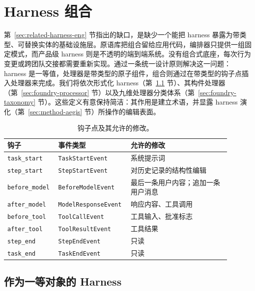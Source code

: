 \section{Harness 组合}
\label{sec:method-foundry}

第~\ref{sec:related-harness-eng} 节指出的缺口，是缺少一个能把 harness 暴露为带类型、可替换实体的基础设施层。原语库把组合留给应用代码，编排器只提供一组固定模式，而产品级 harness 则是不透明的端到端系统。没有组合式底座，每次行为变更或跨团队交接都需要重新实现。\ProjectName 通过一条统一设计原则解决这一问题：harness 是一等值，处理器是带类型的原子组件，组合则通过在带类型的钩子点插入处理器来完成。我们将依次形式化 harness（第~\ref{sec:foundry-object} 节）、其构件处理器（第~\ref{sec:foundry-processor} 节）以及九维处理器分类体系（第~\ref{sec:foundry-taxonomy} 节）。这些定义有意保持简洁：其作用是建立术语，并显露 harness 演化（第~\ref{sec:method-aegis} 节）所操作的编辑表面。

\begin{table}[!htbp]
\centering
\small
\begin{tabular}{p{0.21\linewidth}p{0.26\linewidth}p{0.43\linewidth}}
\toprule
钩子 & 事件类型 & 允许的修改 \\
\midrule
\texttt{task\_start}    & \texttt{TaskStartEvent}     & 系统提示词 \\
\texttt{step\_start}    & \texttt{StepStartEvent}     & 对历史记录的结构性编辑 \\
\texttt{before\_model}  & \texttt{BeforeModelEvent}   & 最后一条用户内容；追加一条用户消息 \\
\texttt{after\_model}   & \texttt{ModelResponseEvent} & 响应内容、工具调用 \\
\texttt{before\_tool}   & \texttt{ToolCallEvent}      & 工具输入、批准标志 \\
\texttt{after\_tool}    & \texttt{ToolResultEvent}    & 工具结果 \\
\texttt{step\_end}      & \texttt{StepEndEvent}       & 只读 \\
\texttt{task\_end}      & \texttt{TaskEndEvent}       & 只读 \\
\bottomrule
\end{tabular}
\caption{钩子点及其允许的修改。}
\label{tab:hook-points}
\end{table}

\subsection{作为一等对象的 Harness}
\label{sec:foundry-object}

